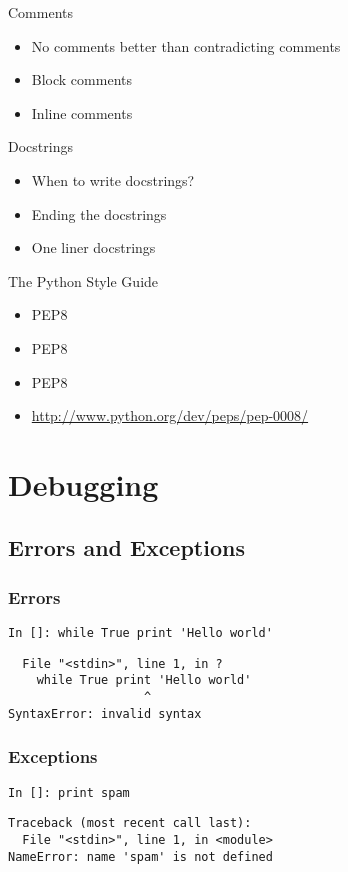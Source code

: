 \documentclass[compress,14pt]{beamer}
\begin{document}
\begin{frame}{Comments}
  \begin{itemize}
        \item No comments better than contradicting comments
        \item Block comments
        \item Inline comments
   \end{itemize}
\end{frame}

\begin{frame}{Docstrings}
  \begin{itemize}
        \item When to write docstrings?
        \item Ending the docstrings
        \item One liner docstrings
   \end{itemize}
\end{frame}

\begin{frame}{The Python Style Guide}
  \begin{itemize}
   \item PEP8
   \item PEP8
   \item PEP8
   \item \url{http://www.python.org/dev/peps/pep-0008/}
   \end{itemize}
\end{frame}

\section{Debugging}
\subsection{Errors and Exceptions}
\begin{frame}[fragile]
 \frametitle{Errors}
 \begin{lstlisting}
In []: while True print 'Hello world'
 \end{lstlisting}
\pause
  \begin{lstlisting}
  File "<stdin>", line 1, in ?
    while True print 'Hello world'
                   ^
SyntaxError: invalid syntax
\end{lstlisting}
\end{frame}

\begin{frame}[fragile]
 \frametitle{Exceptions}
 \begin{lstlisting}
In []: print spam
\end{lstlisting}
\pause
\begin{lstlisting}
Traceback (most recent call last):
  File "<stdin>", line 1, in <module>
NameError: name 'spam' is not defined
\end{lstlisting}
\end{frame}
\end{document}
